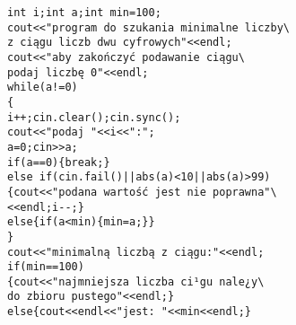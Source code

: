 \begin{verbatim}
int i;int a;int min=100;
cout<<"program do szukania minimalne liczby\
z ciągu liczb dwu cyfrowych"<<endl;  
cout<<"aby zakończyć podawanie ciągu\
podaj liczbę 0"<<endl;  
while(a!=0)
{  
i++;cin.clear();cin.sync();
cout<<"podaj "<<i<<":";
a=0;cin>>a;        
if(a==0){break;}
else if(cin.fail()||abs(a)<10||abs(a)>99)
{cout<<"podana wartość jest nie poprawna"\
<<endl;i--;}
else{if(a<min){min=a;}}
}
cout<<"minimalną liczbą z ciągu:"<<endl;
if(min==100)
{cout<<"najmniejsza liczba ci¹gu nale¿y\
do zbioru pustego"<<endl;}
else{cout<<endl<<"jest: "<<min<<endl;}
\end{verbatim}